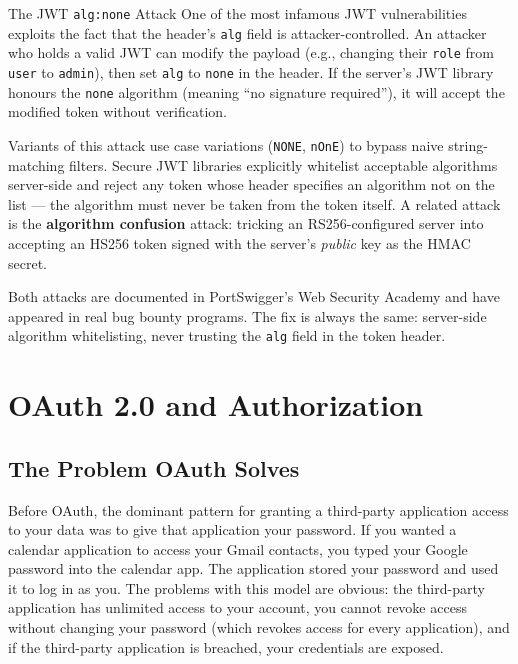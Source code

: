 \documentclass[11pt,a4paper]{article}
\begin{document}
\begin{trapbox}{The JWT \texttt{alg:none} Attack}
One of the most infamous JWT vulnerabilities exploits the fact that the header's \texttt{alg} field is attacker-controlled. An attacker who holds a valid JWT can modify the payload (e.g., changing their \texttt{role} from \texttt{user} to \texttt{admin}), then set \texttt{alg} to \texttt{none} in the header. If the server's JWT library honours the \texttt{none} algorithm (meaning ``no signature required''), it will accept the modified token without verification.

Variants of this attack use case variations (\texttt{NONE}, \texttt{nOnE}) to bypass naive string-matching filters. Secure JWT libraries explicitly whitelist acceptable algorithms server-side and reject any token whose header specifies an algorithm not on the list --- the algorithm must never be taken from the token itself. A related attack is the \textbf{algorithm confusion} attack: tricking an RS256-configured server into accepting an HS256 token signed with the server's \textit{public} key as the HMAC secret.

Both attacks are documented in PortSwigger's Web Security Academy and have appeared in real bug bounty programs. The fix is always the same: server-side algorithm whitelisting, never trusting the \texttt{alg} field in the token header.
\end{trapbox}

\section{OAuth 2.0 and Authorization}

\subsection{The Problem OAuth Solves}

Before OAuth, the dominant pattern for granting a third-party application access to your data was to give that application your password. If you wanted a calendar application to access your Gmail contacts, you typed your Google password into the calendar app. The application stored your password and used it to log in as you. The problems with this model are obvious: the third-party application has unlimited access to your account, you cannot revoke access without changing your password (which revokes access for every application), and if the third-party application is breached, your credentials are exposed.
\end{document}
